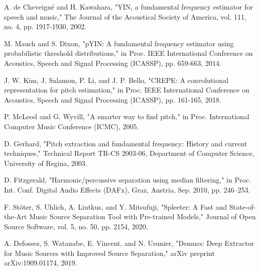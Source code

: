 \documentclass[conference]{IEEEtran}
\begin{document}
\begin{thebibliography}{00}
 A. de Cheveigné and H. Kawahara, "YIN, a fundamental frequency estimator for speech and music," The Journal of the Acoustical Society of America, vol. 111, no. 4, pp. 1917-1930, 2002.

 M. Mauch and S. Dixon, "pYIN: A fundamental frequency estimator using probabilistic threshold distributions," in Proc. IEEE International Conference on Acoustics, Speech and Signal Processing (ICASSP), pp. 659-663, 2014.

 J. W. Kim, J. Salamon, P. Li, and J. P. Bello, "CREPE: A convolutional representation for pitch estimation," in Proc. IEEE International Conference on Acoustics, Speech and Signal Processing (ICASSP), pp. 161-165, 2018.

 P. McLeod and G. Wyvill, "A smarter way to find pitch," in Proc. International Computer Music Conference (ICMC), 2005.

 D. Gerhard, "Pitch extraction and fundamental frequency: History and current techniques," Technical Report TR-CS 2003-06, Department of Computer Science, University of Regina, 2003.

 D. Fitzgerald, "Harmonic/percussive separation using median filtering," in Proc. Int. Conf. Digital Audio Effects (DAFx), Graz, Austria, Sep. 2010, pp. 246–253.

 F. Stöter, S. Uhlich, A. Liutkus, and Y. Mitsufuji, "Spleeter: A Fast and State-of-the-Art Music Source Separation Tool with Pre-trained Models," Journal of Open Source Software, vol. 5, no. 50, pp. 2154, 2020.

 A. Defossez, S. Watanabe, E. Vincent, and N. Usunier, "Demucs: Deep Extractor for Music Sources with Improved Source Separation," arXiv preprint arXiv:1909.01174, 2019.

\end{thebibliography}
\end{document}

